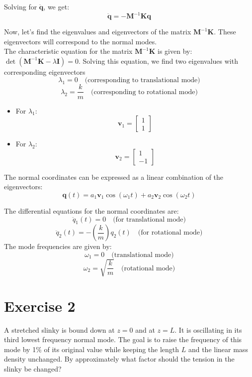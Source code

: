 \documentclass{article}
\newcommand{\pregunta}[1]{\begin{note}#1\end{note}}
\begin{document}
   Solving for \(\mathbf{\ddot{q}}\), we get:
   \[
   \mathbf{\ddot{q}} = -\mathbf{M}^{-1} \mathbf{K} \mathbf{q}
   \]

   \noindent Now, let's find the eigenvalues and eigenvectors of the matrix \(\mathbf{M}^{-1} \mathbf{K}\). These eigenvectors will correspond to the normal modes.\\

   \noindent The characteristic equation for the matrix \(\mathbf{M}^{-1} \mathbf{K}\) is given by: $\det(\mathbf{M}^{-1} \mathbf{K} - \lambda \mathbf{I}) = 0$.
   \noindent Solving this equation, we find two eigenvalues with corresponding eigenvectors
   \[
   \lambda_1 = 0 \quad \text{(corresponding to translational mode)}
   \]
   \[
   \lambda_2 = \frac{k}{m} \quad \text{(corresponding to rotational mode)}
   \]

   \begin{itemize}
   \item For \(\lambda_1\):
     \[
     \mathbf{v}_1 = \begin{bmatrix} 1 \\ 1 \end{bmatrix}
     \]
   \item For \(\lambda_2\):
     \[
     \mathbf{v}_2 = \begin{bmatrix} 1 \\ -1 \end{bmatrix}
     \]
    \end{itemize}
\clearpage
   \noindent The normal coordinates can be expressed as a linear combination of the eigenvectors:
   \[
   \mathbf{q}(t) = a_1 \mathbf{v}_1 \cos(\omega_1 t) + a_2 \mathbf{v}_2 \cos(\omega_2 t)
   \]

   \noindent The differential equations for the normal coordinates are:
   \[
   \ddot{q}_1(t) = 0 \quad \text{(for translational mode)}
   \]
   \[
   \ddot{q}_2(t) = -\left(\frac{k}{m}\right) q_2(t) \quad \text{(for rotational mode)}
   \]
    \noindent The mode frequencies are given by:
   \[
   \omega_1 = 0 \quad \text{(translational mode)}
   \]
   \[
   \omega_2 = \sqrt{\frac{k}{m}} \quad \text{(rotational mode)}
   \]
\clearpage
\section*{Exercise 2}
\pregunta{
A stretched slinky is bound down at \(z = 0\) and at \(z = L\). It is oscillating in its third lowest frequency normal mode. The goal is to raise the frequency of this mode by 1\% of its original value while keeping the length \(L\) and the linear mass density unchanged. By approximately what factor should the tension in the slinky be changed?}
\end{document}
